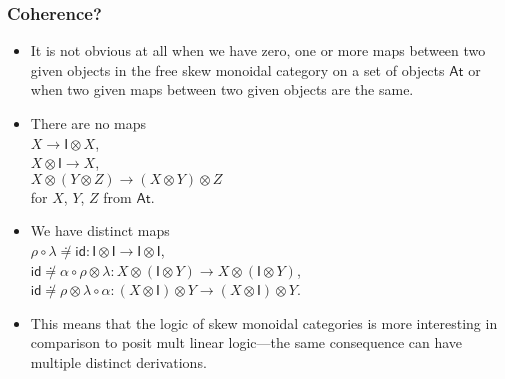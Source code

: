 \documentclass[10pt,t]{beamer}
\newcommand{\I}{\mathsf{I}}
\newcommand{\ot}{\otimes}
\newcommand{\C}{\mathbb{C}}
\newcommand{\al}{\alpha}
\newcommand{\lam}{\lambda}
\newcommand{\Var}{\mathsf{At}}
\newcommand{\id}{\mathsf{id}}
\newcommand{\comp}{\circ}
\newcommand{\e}{\mathsf{e}}
\newcommand{\m}{\mathsf{m}}
\begin{document}

 








\begin{frame}

\frametitle{Coherence?}

\begin{itemize}

\item It is not obvious at all when we have zero, one or more maps
  between two given objects in the free skew monoidal category on a
  set of objects $\Var$ or when two given maps between two given
  objects are the same.

\bigskip

\item There are no maps \\[6pt]

 $X \to \I \ot X$, \\ 

 $X \ot \I \to X$, \\

 $X \ot (Y \ot Z) \to (X \ot Y) \ot Z$ \\[6pt]

for $X$, $Y$, $Z$ from $\Var$.

\medskip

\item We have distinct maps \\[6pt]

 $\rho \comp \lam \not\doteq \id : \I \ot \I \to \I \ot \I$, \\

 $\id \not\doteq \al \comp  \rho \ot \lam : 
 X \ot (\I \ot Y) \to X \ot (\I \ot Y) $, \\

 $\id \not\doteq \rho \ot \lam \comp \al :
 (X \ot \I) \ot Y \to (X \ot \I) \ot Y$.

\bigskip


\item This means that the logic of skew monoidal categories is more
  interesting in comparison to posit mult linear logic---the same
  consequence can have multiple distinct derivations.

\end{itemize}

\end{frame}
\end{document}
